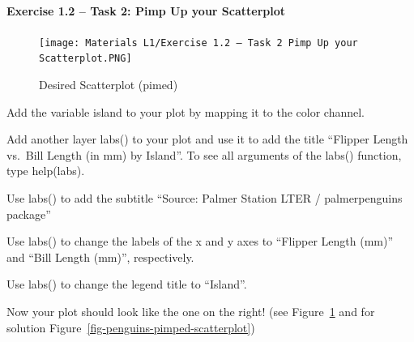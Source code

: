 \documentclass[
  letterpaper,
  DIV=11,
  numbers=noendperiod]{scrartcl}
\let\oldparagraph\paragraph
\renewcommand{\paragraph}[1]{\oldparagraph{#1}\mbox{}}
\begin{document}
\hypertarget{exercise-1.2-task-2-pimp-up-your-scatterplot}{%
\paragraph{Exercise 1.2 -- Task 2: Pimp Up your
Scatterplot}\label{exercise-1.2-task-2-pimp-up-your-scatterplot}}

\begin{figure}

{\centering \texttt{[image: Materials L1/Exercise 1.2 – Task 2 Pimp Up your Scatterplot.PNG]}

}

\caption{\label{fig-desired-scatterplot2}Desired Scatterplot (pimed)}

\end{figure}

Add the variable island to your plot by mapping it to the color channel.

Add another layer labs() to your plot and use it to add the title
``Flipper Length vs.~Bill Length (in mm) by Island''. To see all
arguments of the labs() function, type help(labs).

Use labs() to add the subtitle ``Source: Palmer Station LTER /
palmerpenguins package''

Use labs() to change the labels of the x and y axes to ``Flipper Length
(mm)'' and ``Bill Length (mm)'', respectively.

Use labs() to change the legend title to ``Island''.

Now your plot should look like the one on the right! (see
Figure~\ref{fig-desired-scatterplot2} and for solution
Figure~\ref{fig-penguins-pimped-scatterplot})
\end{document}
